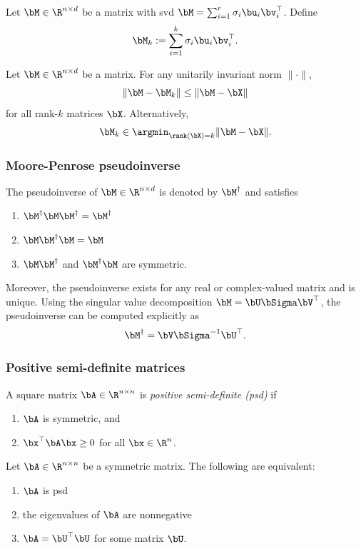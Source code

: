 \begin{definition}
    Let $\bM \in \R^{n\times d}$ be a matrix with svd $\bM = \sum_{i=1}^r \sigma_i\bu_i\bv_i^\top$. Define
    \[\bM_k := \sum_{i=1}^k \sigma_i\bu_i\bv_i^\top.\]
\end{definition}
\begin{theorem}
    Let $\bM\in \R^{n\times d}$ be a matrix. For any unitarily invariant norm $\|\cdot\|$, 
    \[\|\bM - \bM_k\|\leq \|\bM - \bX\|\]
    for all rank-$k$ matrices $\bX$. Alternatively,
    \[\bM_k\in\argmin_{\rank(\bX) = k} \|\bM - \bX\|.\]
\end{theorem}


\subsubsection{Moore-Penrose pseudoinverse}
The pseudoinverse of $\bM\in\R^{n\times d}$ is denoted by $\bM^\dagger$ and satisfies
\begin{enumerate}
    \item $\bM^\dagger\bM\bM^\dagger = \bM^\dagger$
    \item $\bM\bM^\dagger\bM = \bM$
    \item $\bM\bM^\dagger$ and $\bM^\dagger\bM$ are symmetric. 
\end{enumerate}
Moreover, the pseudoinverse exists for any real or complex-valued matrix and is unique. Using the singular value decomposition $\bM = \bU\bSigma\bV^\top$, the pseudoinverse can be computed explicitly as 
\[\bM^\dagger = \bV\bSigma^{-1}\bU^\top.\]

\subsubsection{Positive semi-definite matrices}
A square matrix $\bA\in \R^{n\times n}$ is \textit{positive semi-definite (psd)} if
\begin{enumerate}
    \item $\bA$ is symmetric, and
    \item $\bx^\top\bA\bx\geq 0$ for all $\bx\in \R^n$.
\end{enumerate}

\begin{proposition}
    Let $\bA\in \R^{n\times n}$ be a symmetric matrix. The following are
    equivalent:
    \begin{enumerate}[before=\setlength\parskip{0pt}]
        \item $\bA$ is psd
        \item the eigenvalues of $\bA$ are nonnegative
        \item $\bA = \bU^\top \bU$ for some matrix $\bU$.
    \end{enumerate}
\end{proposition}

